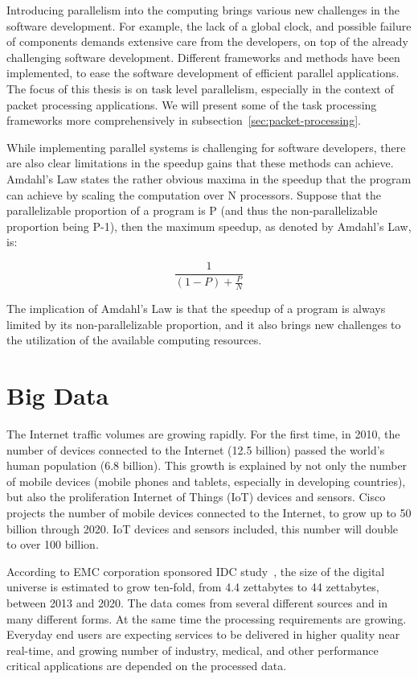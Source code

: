 Introducing parallelism into the computing brings various new challenges in the software development. For example, the lack of a global clock, and possible failure of components demands extensive care from the developers, on top of the already challenging software development. Different frameworks and methods have been implemented, to ease the software development of efficient parallel applications. The focus of this thesis is on task level parallelism, especially in the context of packet processing applications. We will present some of the task processing frameworks more comprehensively in subsection~\ref{sec:packet-processing}.~\cite{Asanovic:2006:Landscape}

While implementing parallel systems is challenging for software developers, there are also clear limitations in the speedup gains that these methods can achieve. Amdahl's Law states the rather obvious maxima in the speedup that the program can achieve by scaling the computation over N processors. Suppose that the parallelizable proportion of a program is P (and thus the non-parallelizable proportion being P-1), then the maximum speedup, as denoted by Amdahl's Law, is:~\cite{Amdahl:1967:VSP}

\begin{equation*}
  \frac{1}{(1-P) + \frac{P}{N}}
\end{equation*}

The implication of Amdahl's Law is that the speedup of a program is always limited by its non-parallelizable proportion, and it also brings new challenges to the utilization of the available computing resources.

\section{Big Data}
\label{section:big-data}
The Internet traffic volumes are growing rapidly. For the first time, in 2010, the number of devices connected to the Internet (12.5 billion) passed the world's human population (6.8 billion). This growth is explained by not only the number of mobile devices (mobile phones and tablets, especially in developing countries), but also the proliferation Internet of Things (IoT) devices and sensors. Cisco projects the number of mobile devices connected to the Internet, to grow up to 50 billion through 2020. IoT devices and sensors included, this number will double to over 100 billion.~\cite{Evans:2011:IoT}

According to EMC corporation sponsored IDC study~\cite{Turner:2014:Digital}, the size of the digital universe is estimated to grow ten-fold, from 4.4 zettabytes to 44 zettabytes, between 2013 and 2020. The data comes from several different sources and in many different forms. At the same time the processing requirements are growing. Everyday end users are expecting services to be delivered in higher quality near real-time, and growing number of industry, medical, and other performance critical applications are depended on the processed data.

